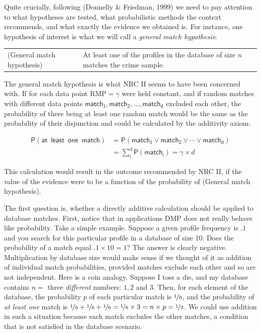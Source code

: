 \documentclass[10pt,dvipsnames,enabledeprecatedfontcommands]{scrartcl}
\newcommand{\pr}[1]{\mathsf{P}(#1)}
\begin{document}
Quite crucially, following (Donnelly \& Friedman, 1999) we need to pay
attention to what hypotheses are tested, what probabilistic methods the
context recommends, and what exactly the evidence we obtained is. For
instance, one hypothesis of interest is what we will call a
\emph{general match hypothesis}: \vspace{1mm}

\begin{tabular}{lp{8cm}}
(General match hypothesis) &
At least one of the profiles in the database of size $n$ 
matches the crime sample.
\end{tabular}

\vspace{1mm} \noindent The general match hypothesis is what NRC II seems
to have been concerned with. If for each data point RMP\(=\gamma\) were
held constant, and if random matches with different data points
\(\mathsf{match_1, match_2, \dots, match_d}\) excluded each other, the
probability of there being at least one random match would be the same
as the probability of their disjunction and could be calculated by the
additivity axiom:

\begin{align*}
\pr{\mathsf{at\,\,\, least\,\,\, one\,\,\, match}} & = \pr{\mathsf{match_1} \vee \mathsf{match_2} \vee \cdots \vee \mathsf{match_d}} \\
& = \sum_{i}^d \pr{\mathsf{match_i}} = \gamma \times d
\end{align*}

This calculation would result in the outcome recommended by NRC II, if
the value of the evidence were to be a function of the probability of
(General match hypothesis).

The first question is, whether a directly additive calculation should be
applied to database matches. First, notice that in applications DMP does
not really behave like probability. Take a simple example. Suppose a
given profile frequency is \(.1\) and you search for this particular
profile in a database of size 10. Does the probability of a match equal
\(.1 \times 10=1\)? The answer is clearly negative. Multiplication by
database size would make sense if we thought of it as addition of
individual match probabilities, provided matches exclude each other and
so are not independent. Here is a coin analogy. Suppose I toss a die,
and my database contains \(n=\) three \emph{different} numbers: \(1, 2\)
and \(3\). Then, for each element of the database, the probability \(p\)
of each particular match is \(\nicefrac{1}{6}\), and the probability of
\emph{at least one} match is
\(\nicefrac{1}{6}+\nicefrac{1}{6}+\nicefrac{1}{6}=\nicefrac{1}{6}\times 3 = n\times p =\nicefrac{1}{2}\).
We could use addition in such a situation because each match excludes
the other matches, a condition that is not satisfied in the database
scenario.
\end{document}

